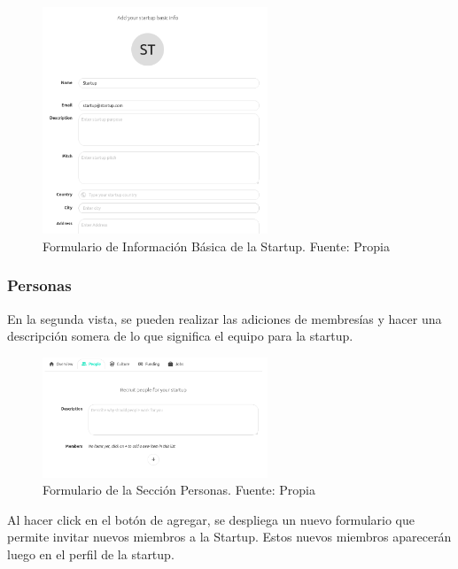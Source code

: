 \begin{figure}[H]
\centering
\includegraphics[width=0.60\textwidth]{img/38.png}
\caption{Formulario de Información Básica de la Startup. Fuente: Propia}
\label{figure:startupsBasicInfoForm}
\end{figure}

\subsubsection{Personas}

En la segunda vista, se pueden realizar las adiciones de membresías y hacer una descripción somera de lo que significa el equipo para la startup.

\begin{figure}[H]
\centering
\includegraphics[width=0.60\textwidth]{img/39.png}
\caption{Formulario de la Sección Personas. Fuente: Propia}
\label{figure:startupsPeople}
\end{figure}

Al hacer click en el botón de agregar, se despliega un nuevo formulario que permite invitar nuevos miembros a la Startup. Estos nuevos miembros aparecerán luego en el perfil de la startup.

